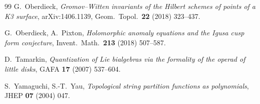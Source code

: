 \documentclass[11pt]{article}
\theoremstyle{plain}
\theoremstyle{definition}
\theoremstyle{remark}
\begin{document}
\begin{thebibliography}{99}
 G.~Oberdieck, \emph{Gromov--Witten invariants
of the Hilbert schemes of points of a K3 surface}, arXiv:1406.1139,
Geom.\ Topol.\ \textbf{22} (2018) 323--437.

 G.~Oberdieck, A.~Pixton,
\emph{Holomorphic anomaly equations and the Igusa cusp form
conjecture}, Invent.\ Math.\ \textbf{213} (2018) 507--587.

 D.~Tamarkin, \emph{Quantization of Lie bialgebras
via the formality of the operad of little disks}, GAFA \textbf{17}
(2007) 537--604.

 S.~Yamaguchi, S.-T.~Yau,
\emph{Topological string partition functions as polynomials},
JHEP \textbf{07} (2004) 047.

\end{thebibliography}
\end{document}

